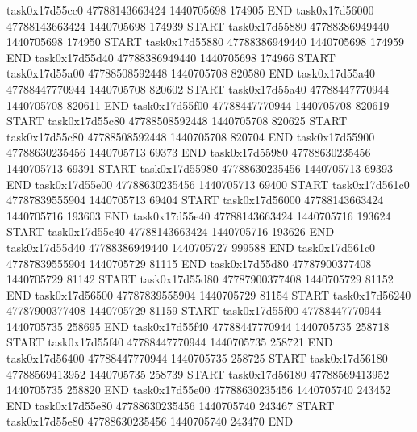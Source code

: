 task0x17d55cc0 47788143663424          1440705698               174905  END
task0x17d56000 47788143663424          1440705698               174939  START
task0x17d55880 47788386949440          1440705698               174950  START
task0x17d55880 47788386949440          1440705698               174959  END
task0x17d55d40 47788386949440          1440705698               174966  START
task0x17d55a00 47788508592448          1440705708               820580  END
task0x17d55a40 47788447770944          1440705708               820602  START
task0x17d55a40 47788447770944          1440705708               820611  END
task0x17d55f00 47788447770944          1440705708               820619  START
task0x17d55c80 47788508592448          1440705708               820625  START
task0x17d55c80 47788508592448          1440705708               820704  END
task0x17d55900 47788630235456          1440705713                69373  END
task0x17d55980 47788630235456          1440705713                69391  START
task0x17d55980 47788630235456          1440705713                69393  END
task0x17d55e00 47788630235456          1440705713                69400  START
task0x17d561c0 47787839555904          1440705713                69404  START
task0x17d56000 47788143663424          1440705716               193603  END
task0x17d55e40 47788143663424          1440705716               193624  START
task0x17d55e40 47788143663424          1440705716               193626  END
task0x17d55d40 47788386949440          1440705727               999588  END
task0x17d561c0 47787839555904          1440705729                81115  END
task0x17d55d80 47787900377408          1440705729                81142  START
task0x17d55d80 47787900377408          1440705729                81152  END
task0x17d56500 47787839555904          1440705729                81154  START
task0x17d56240 47787900377408          1440705729                81159  START
task0x17d55f00 47788447770944          1440705735               258695  END
task0x17d55f40 47788447770944          1440705735               258718  START
task0x17d55f40 47788447770944          1440705735               258721  END
task0x17d56400 47788447770944          1440705735               258725  START
task0x17d56180 47788569413952          1440705735               258739  START
task0x17d56180 47788569413952          1440705735               258820  END
task0x17d55e00 47788630235456          1440705740               243452  END
task0x17d55e80 47788630235456          1440705740               243467  START
task0x17d55e80 47788630235456          1440705740               243470  END
